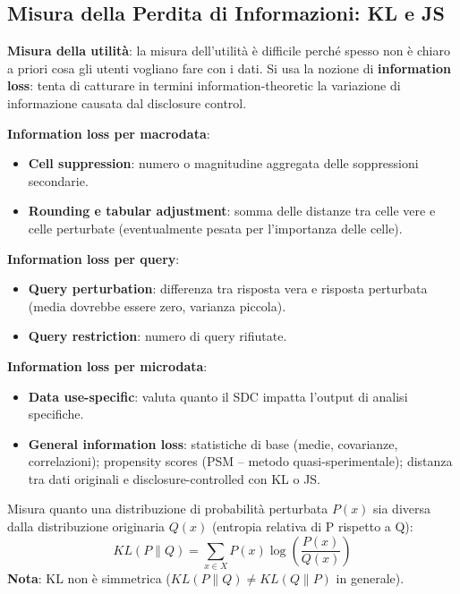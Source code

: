 \documentclass[a4paper,11pt]{article}
\begin{document}
\subsection{Misura della Perdita di Informazioni: KL e JS}

\textbf{Misura della utilit\`{a}}: la misura dell'utilit\`{a} \`{e} difficile perch\'{e} spesso non \`{e} chiaro a priori cosa gli utenti vogliano fare con i dati. Si usa la nozione di \textbf{information loss}: tenta di catturare in termini information-theoretic la variazione di informazione causata dal disclosure control.

\textbf{Information loss per macrodata}:
\begin{itemize}
  \item \textbf{Cell suppression}: numero o magnitudine aggregata delle soppressioni secondarie.
  \item \textbf{Rounding e tabular adjustment}: somma delle distanze tra celle vere e celle perturbate (eventualmente pesata per l'importanza delle celle).
\end{itemize}

\textbf{Information loss per query}:
\begin{itemize}
  \item \textbf{Query perturbation}: differenza tra risposta vera e risposta perturbata (media dovrebbe essere zero, varianza piccola).
  \item \textbf{Query restriction}: numero di query rifiutate.
\end{itemize}

\textbf{Information loss per microdata}:
\begin{itemize}
  \item \textbf{Data use-specific}: valuta quanto il SDC impatta l'output di analisi specifiche.
  \item \textbf{General information loss}: statistiche di base (medie, covarianze, correlazioni); propensity scores (PSM -- metodo quasi-sperimentale); distanza tra dati originali e disclosure-controlled con KL o JS.
\end{itemize}

\begin{definizione}
Misura quanto una distribuzione di probabilit\`{a} perturbata $P(x)$ sia diversa dalla distribuzione originaria $Q(x)$ (entropia relativa di P rispetto a Q):
\[
KL(P \| Q) = \sum_{x \in X} P(x) \log\!\left(\frac{P(x)}{Q(x)}\right)
\]
\textbf{Nota}: KL non \`{e} simmetrica ($KL(P\|Q) \neq KL(Q\|P)$ in generale).
\end{definizione}
\end{document}
